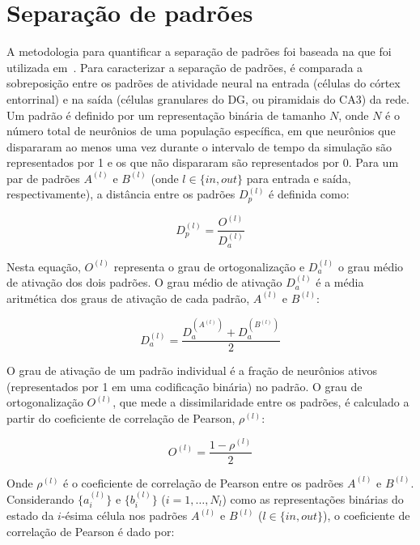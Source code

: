 \section{Separação de padrões}

A metodologia para quantificar a separação de padrões foi baseada na que foi utilizada em~\cite{kimEffect2024}.
Para caracterizar a separação de padrões, é comparada a sobreposição entre os padrões de atividade neural na entrada (células do
córtex entorrinal) e na saída (células granulares do DG, ou piramidais do CA3) da rede. Um padrão é definido por um
representação binária de tamanho $N$, onde $N$ é o número total de neurônios de uma população específica, em que neurônios que
dispararam ao menos uma vez durante o intervalo de tempo da simulação são representados por 1 e os que não dispararam são
representados por 0. Para um par de padrões $A^{(l)}$ e $B^{(l)}$ (onde $l \in \{in, out\}$ para entrada e saída,
respectivamente), a distância entre os padrões $D_p^{(l)}$ é definida como:

\begin{equation}
    \label{eq:dp}
    D_p^{(l)} = \frac{O^{(l)}}{D_a^{(l)}}
\end{equation}

Nesta equação, $O^{(l)}$ representa o grau de ortogonalização e $D_a^{(l)}$ o grau médio de ativação dos dois padrões. O grau médio de ativação $D_a^{(l)}$ é a média aritmética dos graus de ativação de cada padrão, $A^{(l)}$ e $B^{(l)}$:

\begin{equation}
    \label{eq:da}
    D_a^{(l)} = \frac{D_a^{(A^{(l)})} + D_a^{(B^{(l)})}}{2}
\end{equation}

O grau de ativação de um padrão individual é a fração de neurônios ativos (representados por 1 em uma codificação binária) no padrão.
O grau de ortogonalização $O^{(l)}$, que mede a dissimilaridade entre os padrões, é calculado a partir do coeficiente de correlação de Pearson, $\rho^{(l)}$:

\begin{equation}
    \label{eq:o}
    O^{(l)} = \frac{1 - \rho^{(l)}}{2}
\end{equation}

Onde $\rho^{(l)}$ é o coeficiente de correlação de Pearson entre os padrões $A^{(l)}$ e $B^{(l)}$.
Considerando $\{a_i^{(l)}\}$ e $\{b_i^{(l)}\}$ ($i=1, \dots, N_l$) como as representações binárias do estado da $i$-ésima célula nos padrões $A^{(l)}$ e $B^{(l)}$ ($l \in \{in, out\}$), o coeficiente de correlação de Pearson é dado por:

